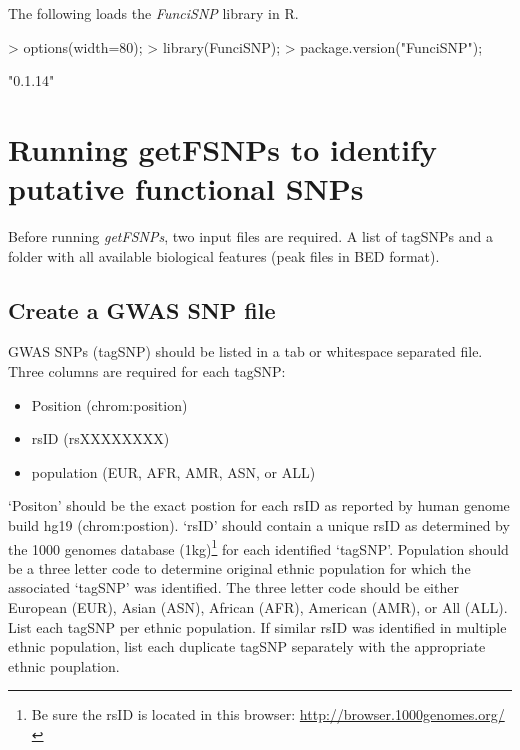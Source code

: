 \documentclass[12pt,fullpage]{article}
\newcommand{\Rpackage}[1]{{\textit{#1}}}
\newcommand{\Rmethod}[1]{{\textit{#1}}}
\begin{document}
The following loads the \Rpackage{FunciSNP} library in R.

\begin{Schunk}
\begin{Sinput}
> options(width=80);
> library(FunciSNP);
> package.version("FunciSNP");
\end{Sinput}
\begin{Soutput}
[1] "0.1.14"
\end{Soutput}
\end{Schunk}

\section{Running getFSNPs to identify putative functional SNPs}

Before running \Rmethod{getFSNPs}, two input files are required. A list of
tagSNPs and a folder with all available biological features (peak files in BED
        format).

\subsection{Create a GWAS SNP file}

GWAS SNPs (tagSNP) should be listed in a tab or whitespace separated file. Three
columns are required for each tagSNP: 

\begin{itemize}
\item Position (chrom:position)
\item rsID (rsXXXXXXXX)
\item population (EUR, AFR, AMR, ASN, or ALL)
\end{itemize}

`Positon' should be the exact postion for each rsID as reported by human genome
build hg19 (chrom:postion). `rsID' should contain a unique rsID as determined by
the 1000 genomes database (1kg)\footnote{Be sure the rsID is located in this
browser: \url{http://browser.1000genomes.org/}} for each identified `tagSNP'.
Population should be a three letter code to determine original ethnic population
for which the associated `tagSNP' was identified. The three letter code should
be either European (EUR), Asian (ASN), African (AFR), American (AMR), or All
(ALL). List each tagSNP per ethnic population. If similar rsID was identified in
multiple ethnic population, list each duplicate tagSNP separately with the
appropriate ethnic pouplation.
\end{document}
